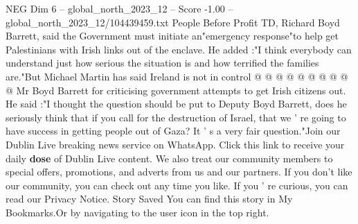 \begin{textsample}{NEG Dim 6 – global\_north\_2023\_12 – Score -1.00 – global\_north\_2023\_12/104439459.txt}
People Before Profit TD, Richard Boyd Barrett, said the Government must initiate an"emergency response"to help get Palestinians with Irish links out of the enclave.
He added :"I think everybody can understand just how serious the situation is and how terrified the families are."But Michael Martin has said Ireland is not in control @ @ @ @ @ @ @ @ @ @ Mr Boyd Barrett for criticising government attempts to get Irish citizens out.
He said :"I thought the question should be put to Deputy Boyd Barrett, does he seriously think that if you call for the destruction of Israel, that we ' re going to have success in getting people out of Gaza?
It ' s a very fair question."Join our Dublin Live breaking news service on WhatsApp.
Click this link to receive your daily \textbf{dose} of Dublin Live content.
We also treat our community members to special offers, promotions, and adverts from us and our partners.
If you don't like our community, you can check out any time you like.
If you ' re curious, you can read our Privacy Notice.
Story Saved You can find this story in My Bookmarks.Or by navigating to the user icon in the top right.

\end{textsample}
